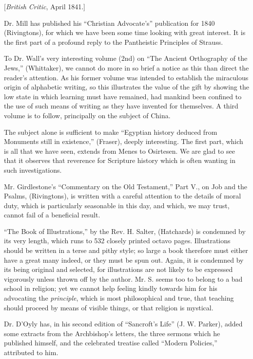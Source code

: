 [\emph{British Critic}, April 1841.]

Dr. Mill has published his ``Christian
Advocate's'' publication for 1840 (Rivingtons), for which we have been
some time looking with great interest. It is the first part of a
profound reply to the Pantheistic Principles of Strauss.

To Dr. Wall's very interesting volume (2nd) on ``The
Ancient Orthography of the Jews,'' (Whittaker), we cannot do more in so
brief a notice as this than direct the reader's attention. As his former
volume was intended to establish the miraculous origin of alphabetic
writing, so this illustrates the value of the gift by showing the low
state in which learning must have remained, had mankind been confined to
the use of such means of writing as they have invented for themselves. A
third volume is to follow, principally on the subject of China.

The subject alone is sufficient to make ``Egyptian
history deduced from Monuments still in existence,'' (Fraser), deeply
interesting. The first part, which is all that we have seen, extends
from Menes to Osirtesen. We are glad to see that it observes that
reverence for Scripture history which is often wanting in such
investigations.

Mr. Girdlestone's ``Commentary on the Old Testament,''
Part V., on Job and the Psalms, (Rivingtons), is written with a careful
attention to the details of moral duty, which is particularly seasonable
in this day, and which, we may trust, cannot fail of a beneficial
result.

``The Book of Illustrations,'' by the Rev. H. Salter,
(Hatchards) is condemned by its very length, which runs to 532 closely
printed octavo pages. Illustrations should be written in a terse and
pithy style; so large a book therefore must either have a great many
indeed, or they must be spun out. Again, it is condemned by its being
original and selected, for illustrations are not likely to be expressed
vigorously unless thrown off by the author. Mr. S. seems too to belong
to a bad school in religion; yet we cannot help feeling kindly towards
him for his advocating the \emph{principle},
which is most philosophical and true, that teaching should
proceed by means of visible things, or that religion is mystical.

Dr. D'Oyly has, in his second edition of ``Sancroft's
Life'' (J. W. Parker), added some extracts from the Archbishop's letters,
the three sermons which he published himself, and the celebrated
treatise called ``Modern Policies,'' attributed to him.


